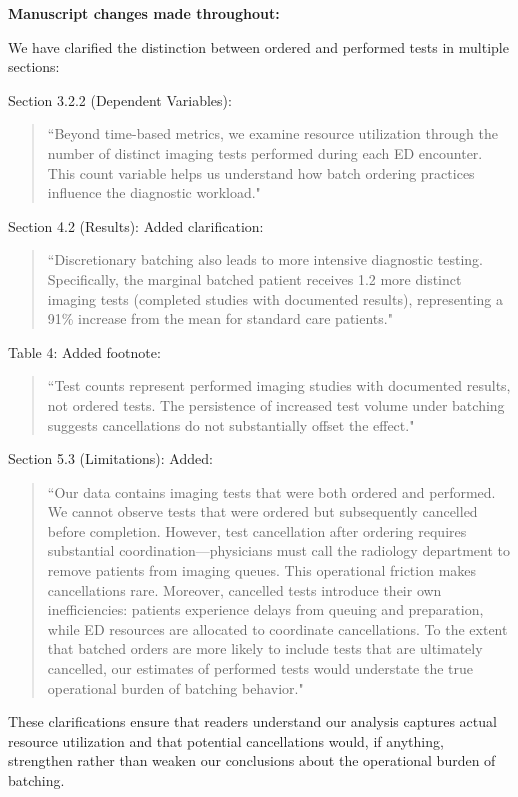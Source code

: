 \documentclass[11pt]{article}
\newcommand{\1}{\hbox{\rm 1\kern-.35em 1}}
\begin{document}
\textbf{Manuscript changes made throughout:}

We have clarified the distinction between ordered and performed tests in multiple sections:

Section 3.2.2 (Dependent Variables): 
\begin{quote}
``Beyond time-based metrics, we examine resource utilization through the number of distinct imaging tests performed during each ED encounter. This count variable helps us understand how batch ordering practices influence the diagnostic workload."
\end{quote}

Section 4.2 (Results): Added clarification: 
\begin{quote}
``Discretionary batching also leads to more intensive diagnostic testing. Specifically, the marginal batched patient receives 1.2 more distinct imaging tests (completed studies with documented results), representing a 91\% increase from the mean for standard care patients."
\end{quote}

Table 4: Added footnote: 
\begin{quote}
``Test counts represent performed imaging studies with documented results, not ordered tests. The persistence of increased test volume under batching suggests cancellations do not substantially offset the effect."
\end{quote}

Section 5.3 (Limitations): Added: 
\begin{quote}
``Our data contains imaging tests that were both ordered and performed. We cannot observe tests that were ordered but subsequently cancelled before completion. However, test cancellation after ordering requires substantial coordination—physicians must call the radiology department to remove patients from imaging queues. This operational friction makes cancellations rare. Moreover, cancelled tests introduce their own inefficiencies: patients experience delays from queuing and preparation, while ED resources are allocated to coordinate cancellations. To the extent that batched orders are more likely to include tests that are ultimately cancelled, our estimates of performed tests would understate the true operational burden of batching behavior."
\end{quote}

These clarifications ensure that readers understand our analysis captures actual resource utilization and that potential cancellations would, if anything, strengthen rather than weaken our conclusions about the operational burden of batching.
\end{document}
